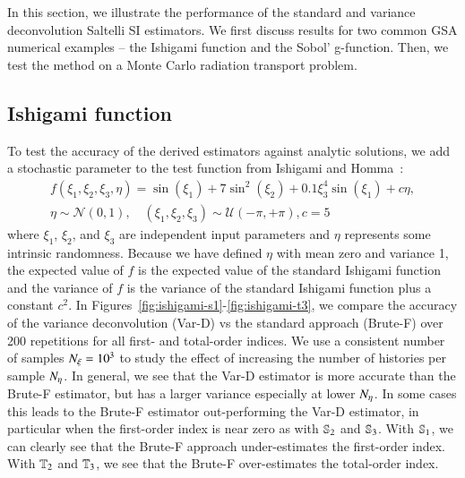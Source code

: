 In this section, we illustrate the performance of the standard and variance deconvolution Saltelli SI estimators. 
We first discuss results for two common GSA numerical examples -- the Ishigami function and the Sobol' g-function.
Then, we test the method on a Monte Carlo radiation transport problem.

\subsection{Ishigami function}
To test the accuracy of the derived estimators against analytic solutions, we add a stochastic parameter to the test function from Ishigami and Homma~\cite{ishigami-homma-1990}:
\begin{gather} \label{m2eq:stoch-ishigami}
    f \left( \xi_1, \xi_2, \xi_3, \eta \right) = \sin \left( \xi_1 \right) + 7 \sin^2 \left( \xi_2 \right) + 0.1 \xi_3^4 \sin \left( \xi_1 \right) + c\eta, \\
    \eta \sim \mathcal{N} \left(0,1\right), \quad (\xi_1, \xi_2, \xi_3) \sim \mathcal{U} \left( -\pi,+\pi\right) , c = 5 \nonumber
\end{gather}
where $\xi_1$, $\xi_2$, and $\xi_3$ are independent input parameters and $\eta$ represents some intrinsic randomness. 
Because we have defined $\eta$ with mean zero and variance 1, the expected value of $f$ is the expected value of the standard Ishigami function and the variance of $f$ is the variance of the standard Ishigami function plus a constant $c^2$. 
In Figures~\ref{fig:ishigami-s1}-\ref{fig:ishigami-t3}, we compare the accuracy of the variance deconvolution (Var-D) vs the standard approach (Brute-F) over 200 repetitions for all first- and total-order indices. 
We use a consistent number of samples $\Nxi = 10^3$ to study the effect of increasing the number of histories per sample $\Neta$.
In general, we see that the Var-D estimator is more accurate than the Brute-F estimator, but has a larger variance especially at lower $\Neta$. 
In some cases this leads to the Brute-F estimator out-performing the Var-D estimator, in particular when the first-order index is near zero as with $\S{2}$ and $\S{3}$.
With $\S{1}$, we can clearly see that the Brute-F approach under-estimates the first-order index. With $\T{2}$ and $\T{3}$, we see that the Brute-F over-estimates the total-order index.
